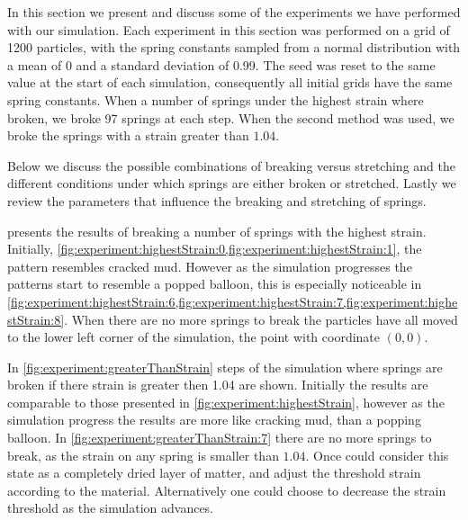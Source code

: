 In this section we present and discuss some of the experiments we have performed with our simulation. Each experiment in this section was performed on a grid of 1200 particles, with the spring constants sampled from a normal distribution with a mean of 0 and a standard deviation of 0.99. The seed was reset to the same value at the start of each simulation, consequently all initial grids have the same spring constants. When a number of springs under the highest strain where broken, we broke 97 springs at each step. When the second method was used, we broke the springs with a strain greater than $1.04$. %

Below we discuss the possible combinations of breaking versus stretching and the different conditions under which springs are either broken or stretched. Lastly we review the parameters that influence the breaking and stretching of springs.

	\begin{figure*}
		\centering
							
		\caption{Several steps of the simulation where at each step where springs were broken the 97 springs with the highest strain are broken.}
		\label{fig:experiment:highestStrain}
	\end{figure*}
	 presents the results of breaking a number of springs with the highest strain. Initially, \cref{fig:experiment:highestStrain:0,fig:experiment:highestStrain:1}, the pattern resembles cracked mud. However as the simulation progresses the patterns start to resemble a popped balloon, this is especially noticeable in \cref{fig:experiment:highestStrain:6,fig:experiment:highestStrain:7,fig:experiment:highestStrain:8}. When there are no more springs to break the particles have all moved to the lower left corner of the simulation, the point with coordinate $(0,0)$.

	\begin{figure*}
		\centering
							
		\caption{Several steps of the simulation where at each step where springs are broken the springs with a strain greater than 1.04 are broken.}
		\label{fig:experiment:greaterThanStrain}
	\end{figure*}
	In \cref{fig:experiment:greaterThanStrain} steps of the simulation where springs are broken if there strain is greater then 1.04 are shown. Initially the results are comparable to those presented in \cref{fig:experiment:highestStrain}, however as the simulation progress the results are more like cracking mud, than a popping balloon. In \cref{fig:experiment:greaterThanStrain:7} there are no more springs to break, as the strain on any spring is smaller than $1.04$. Once could consider this state as a completely dried layer of matter, and adjust the threshold strain according to the material. Alternatively one could choose to decrease the strain threshold as the simulation advances.
	
